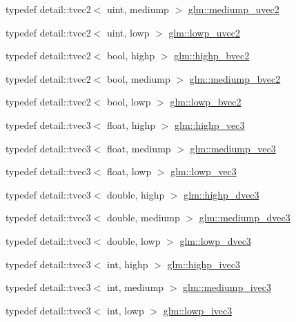 \begin{DoxyCompactItemize}
\item 
typedef detail\+::tvec2$<$ uint, mediump $>$ \hyperlink{group__core__precision_ga15c8fb77bdb6763ef73b39e02eb98a56}{glm\+::mediump\+\_\+uvec2}
\item 
typedef detail\+::tvec2$<$ uint, lowp $>$ \hyperlink{group__core__precision_ga06c64bb528bbecf276ab2d4a2b6c934e}{glm\+::lowp\+\_\+uvec2}
\item 
typedef detail\+::tvec2$<$ bool, highp $>$ \hyperlink{group__core__precision_ga4153415d1f3d390219ac9464652ac377}{glm\+::highp\+\_\+bvec2}
\item 
typedef detail\+::tvec2$<$ bool, mediump $>$ \hyperlink{group__core__precision_ga1406d96eb96694d91052d3f882658ab2}{glm\+::mediump\+\_\+bvec2}
\item 
typedef detail\+::tvec2$<$ bool, lowp $>$ \hyperlink{group__core__precision_ga8ff6222d4bb4245106dab0727c8e8a45}{glm\+::lowp\+\_\+bvec2}
\item 
typedef detail\+::tvec3$<$ float, highp $>$ \hyperlink{group__core__precision_ga4879124da7a18d6b681d933cb8c4267d}{glm\+::highp\+\_\+vec3}
\item 
typedef detail\+::tvec3$<$ float, mediump $>$ \hyperlink{group__core__precision_ga10acc767a046b85205f52ce7f834626f}{glm\+::mediump\+\_\+vec3}
\item 
typedef detail\+::tvec3$<$ float, lowp $>$ \hyperlink{group__core__precision_ga062795097526e2758d34cb38387dd82d}{glm\+::lowp\+\_\+vec3}
\item 
typedef detail\+::tvec3$<$ double, highp $>$ \hyperlink{group__core__precision_ga4962711854156dae8ebb4eb39237c542}{glm\+::highp\+\_\+dvec3}
\item 
typedef detail\+::tvec3$<$ double, mediump $>$ \hyperlink{group__core__precision_gac051f0702cb0e717db5dd913f6261388}{glm\+::mediump\+\_\+dvec3}
\item 
typedef detail\+::tvec3$<$ double, lowp $>$ \hyperlink{group__core__precision_ga9bdb864f7242863e1227e3209f5b2dc4}{glm\+::lowp\+\_\+dvec3}
\item 
typedef detail\+::tvec3$<$ int, highp $>$ \hyperlink{group__core__precision_gae9f0a321de8ee92dce9d4400362d71e7}{glm\+::highp\+\_\+ivec3}
\item 
typedef detail\+::tvec3$<$ int, mediump $>$ \hyperlink{group__core__precision_ga520d24fa0ea887284b80a02c062ca7b8}{glm\+::mediump\+\_\+ivec3}
\item 
typedef detail\+::tvec3$<$ int, lowp $>$ \hyperlink{group__core__precision_gad133fec5c629e3f712c1270e15144e6c}{glm\+::lowp\+\_\+ivec3}

\end{DoxyCompactItemize}
